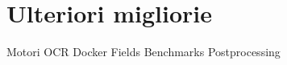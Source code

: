 \chapter{Ulteriori migliorie}
\label{improvements}

Motori OCR 
Docker
Fields
Benchmarks
Postprocessing
